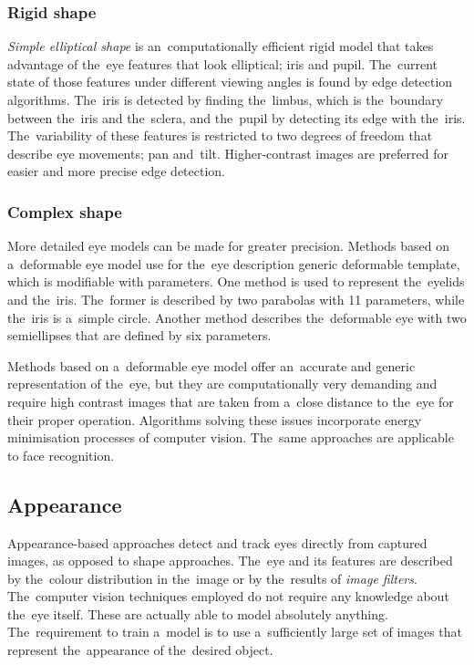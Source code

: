 \subsubsection*{Rigid shape}
\emph{Simple elliptical shape} is an~computationally efficient rigid model that takes advantage of the~eye features that look elliptical; iris and pupil. The~current state of those features under different viewing angles is found by edge detection algorithms. The~iris is detected by finding the~limbus, which is the~boundary between the~iris and the~sclera, and the~pupil by detecting its edge with the~iris. The~variability of these features is restricted to two degrees of freedom that describe eye movements; pan and~tilt. Higher-contrast images are preferred for easier and more precise edge detection.

\subsubsection*{Complex shape}
More detailed eye models can be made for greater precision. Methods based on a~deformable eye model use for the~eye description generic deformable template, which is modifiable with parameters. One method is used to represent the~eyelids and the~iris. The~former is described by two parabolas with 11 parameters, while the~iris is a~simple circle. Another method describes the~deformable eye with two semiellipses that are defined by six parameters. 

Methods based on a~deformable eye model offer an~accurate and generic representation of the~eye, but they are computationally very demanding and require high contrast images that are taken from a~close distance to the~eye for their proper operation. Algorithms solving these issues incorporate energy minimisation processes of computer vision. The~same approaches are applicable to face recognition. 

\subsection{Appearance}

Appearance-based approaches detect and track eyes directly from captured images, as opposed to shape approaches. The~eye and its features are described by the~colour distribution in the~image or by the~results of \emph{image filters}. The~computer vision techniques employed do not require any knowledge about the~eye itself. These are actually able to model absolutely anything. The~requirement to train a~model is to use a~sufficiently large set of images that represent the~appearance of the~desired object. 


